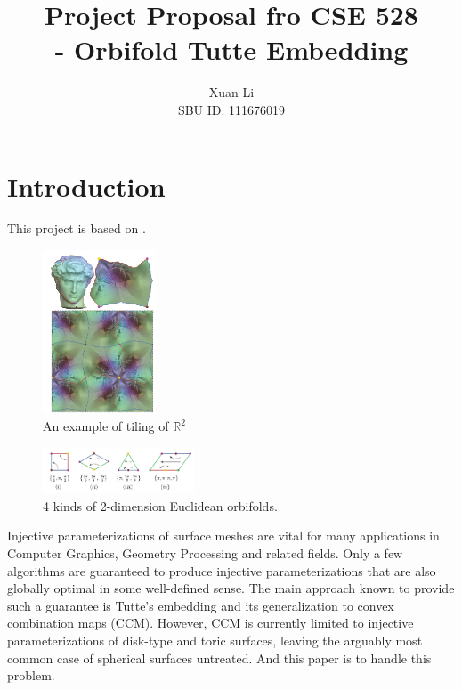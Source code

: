 \documentclass[journal, a4paper]{IEEEtran}
\begin{document}
	\title{Project Proposal fro CSE 528\\ - Orbifold Tutte Embedding}
	\author{Xuan Li\\ SBU ID: 111676019}
	\maketitle


\section{Introduction}
	This project is based on \cite{aigerman2015orbifold}.
     \begin{figure}
    \centering
  \includegraphics[width=0.3\textwidth]{images/tiles.png}
    \caption{An example of tiling of $\mathbb{R}^2$}
    \label{Fig:tiles}
    \end{figure}
    
    
    \begin{figure}
    \centering
  \includegraphics[width=0.4\textwidth]{images/orbifolds}
    \caption{4 kinds of 2-dimension Euclidean orbifolds.}
    \label{Fig:orbifolds}
    \end{figure}
    Injective parameterizations of surface meshes are vital for many applications in Computer Graphics, Geometry Processing and related fields. Only a few algorithms are guaranteed to produce injective parameterizations that are also globally optimal in some well-defined sense. The main approach known to provide such a guarantee is Tutte’s embedding and its generalization to convex combination maps (CCM). However, CCM is currently limited to injective parameterizations of disk-type and toric surfaces, leaving the arguably most common case of spherical surfaces untreated. And this paper is to handle this problem.
    
\end{document}
